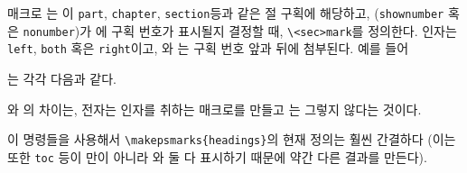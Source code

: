 매크로
\cmd{\createmark}는
이 \texttt{part}, \texttt{chapter}, \texttt{section}등과 같은 절
구획에 해당하고, (\texttt{shownumber} 혹은 \texttt{nonumber})가
에 구획 번호가 표시될지 결정할 때, \verb|\<sec>mark|를 정의한다.
 인자는 \texttt{left}, \texttt{both} 혹은 \texttt{right}이고,
와 는 구획 번호 앞과 뒤에 첨부된다.
예를 들어
\begin{lcode}
\end{lcode}
는 각각 다음과 같다.
\begin{lcode}
\def\sectionmark#1{\markboth{#1}{}}
\def\sectionmark#1{\markboth{#1}{#1}}
\def\sectionmark#1{\markight{#1}}
\end{lcode}

\cmd{\createmark}와 \cmd{\createplainmark}의 차이는, 전자는 인자를 취하는
매크로를 만들고 \cmd{\createplainmark}는 그렇지 않다는 것이다.


이 명령들을 사용해서  \verb|\makepsmarks{headings}|의 현재 정의는 훨씬
간결하다 (이는 또한 \texttt{toc} 등이 \cmd{\leftmark}만이 아니라
\cmd{\leftmark}와 \cmd{\rightmark} 둘 다 표시하기 때문에 약간 다른 결과를
만든다).
\begin{lcode}
\end{lcode}


